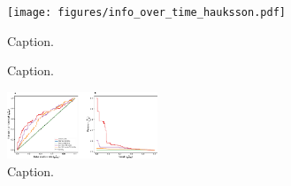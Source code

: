 \documentclass[pdflatex]{sn-jnl}
\begin{document}
\begin{figure}[h!]
    \centering
    \texttt{[image: figures/info\_over\_time\_hauksson.pdf]}
    \caption{
        Caption.
    }
    \label{fig:architecture}
\end{figure}


\begin{figure}[h!]
    \centering
    \caption{
        Caption.
    }
    \label{fig:architecture}
\end{figure}

\begin{figure}[h!]
    \centering
    \includegraphics[width=0.4\textwidth]{figures/ROC_PR_hauksson.pdf}
    \caption{
        Caption.
    }
    \label{fig:architecture}
\end{figure}









\let\oldbibliography\thebibliography
\renewcommand{\thebibliography}[1]{%
  \oldbibliography{#1}%
  \setlength{\itemsep}{10pt}%
}
% 
% 
\newpage


\let\oldthebibliography=\thebibliography
\let\oldendthebibliography=\endthebibliography
\renewenvironment{thebibliography}[1]{
    \oldthebibliography{#1}
    \setcounter{enumiv}{34}
}{\oldendthebibliography}
\end{document}
